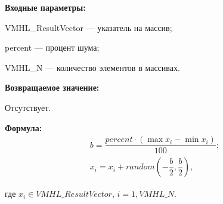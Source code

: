 \textbf{Входные параметры:}  

 VMHL\_ResultVector --- указатель на массив;
 
 percent --- процент шума;
 
 VMHL\_N --- количество элементов в массивах.

\textbf{Возвращаемое значение:}

Отсутствует.

\textbf{Формула:}
\begin{eqnarray*}
b=\dfrac{percent\cdot\left( \max{x_i}-\min{x_i}\right)}{100};\\
x_i=x_i+random \left( -\dfrac{b}{2},\dfrac{b}{2}\right),
\end{eqnarray*}

где $x_i \in VMHL\_ResultVector$, $i=\overline{1,VMHL\_N}$.